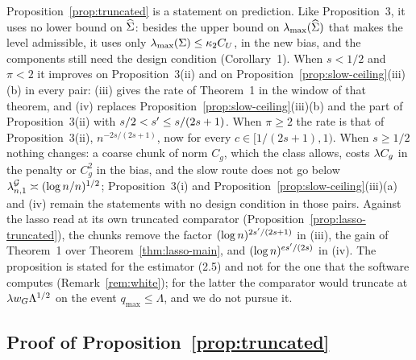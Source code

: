 Proposition~\ref{prop:truncated} is a statement on prediction. Like
Proposition~3, it uses no lower bound on $\widehat{\Sigma}$: besides the upper bound
on $\lambda_{\max}(\widehat{\Sigma})$ that makes the level admissible, it uses only
$\lambda_{\max}(\Sigma) \le \kappa_2C_U$, in the new bias, and the components still
need the design condition (Corollary~1). When $s < 1/2$ and $\pi < 2$ it
improves on Proposition~3(ii) and on Proposition~\ref{prop:slow-ceiling}(iii)(b)
in every pair: (iii) gives the rate of Theorem~1 in the window of that
theorem, and (iv) replaces Proposition~\ref{prop:slow-ceiling}(iii)(b) and the
part of Proposition~3(ii) with $s/2 < s' \le s/(2s+1)$. When $\pi \ge 2$
the rate is that of Proposition~3(ii), $n^{-2s/(2s+1)}$, now for every
$c \in [1/(2s+1),1)$. When $s \ge 1/2$ nothing changes: a coarse chunk of
norm $C_g$, which the class allows, costs $\lambda C_g$ in the penalty or $C_g^{2}$ in the bias, and
the slow route does not go below $\lambda^{\mathcal{G}}_{n,1} \asymp (\log n/n)^{1/2}$;
Proposition~3(i) and Proposition~\ref{prop:slow-ceiling}(iii)(a) and (iv)
remain the statements with no design condition in those pairs. Against the
lasso read at its own truncated comparator
(Proposition~\ref{prop:lasso-truncated}), the chunks remove the factor
$(\log n)^{2s'/(2s+1)}$ in (iii), the gain of Theorem~1 over
Theorem~\ref{thm:lasso-main}, and $(\log n)^{es'/(2s)}$ in (iv). The
proposition is stated for the estimator (2.5) and not for the one that the
software computes (Remark~\ref{rem:white}); for the latter the comparator
would truncate at $\lambda w_{G}\Lambda^{1/2}$ on the event $q_{\max} \le \Lambda$,
and we do not pursue it.

\subsection*{Proof of Proposition~\ref{prop:truncated}}

